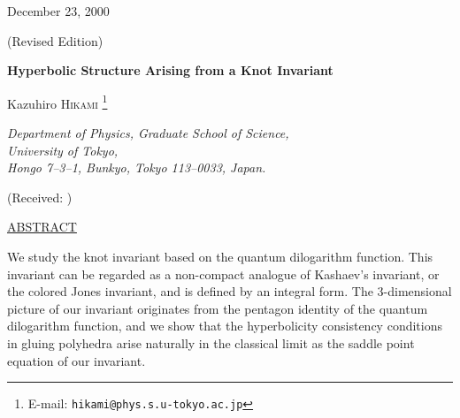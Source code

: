 \documentclass[12pt]{article}
\numberwithin{equation}{section}
\begin{document}



\baselineskip 21pt
\parskip 7pt


\hfill  December 23, 2000

\hfill (Revised Edition)
\vskip -1cm

\vspace{24pt}

\begin{center}

  {\Large\textbf{
      Hyperbolic Structure Arising from a Knot Invariant
      }
    }

  \vspace{24pt}

  {\large Kazuhiro \textsc{Hikami}}
  \footnote[2]{E-mail:
    \texttt{hikami@phys.s.u-tokyo.ac.jp}
    }


  \textsl{Department of Physics, Graduate School of Science,\\
    University of Tokyo,\\
    Hongo 7--3--1, Bunkyo, Tokyo 113--0033, Japan.
    }



(Received: \hspace{40mm})







\end{center}




\begin{center}
  \underline{ABSTRACT}
\end{center}

We study the knot invariant based on the quantum dilogarithm function.
This invariant can  be regarded as a non-compact analogue of Kashaev's
invariant, or the
colored Jones invariant, and is defined  by an integral form.
The 3-dimensional picture of our invariant
originates from  the pentagon identity of
the quantum dilogarithm function,
and
we show  that  the hyperbolicity consistency conditions in gluing
polyhedra
arise naturally
in the classical limit
as the saddle point equation of our invariant.
\end{document}

